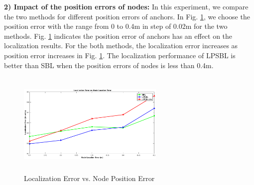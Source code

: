 \textbf{2) Impact of the position errors of nodes:}
 In this experiment, we compare the two methods for different position errors of anchors. 
 In Fig. \ref{fig5}, we choose the position error with the range from 0 to 0.4m in step of 0.02m for the two methods. 
 Fig. \ref{fig5} indicates the position error of anchors has an effect on the localization results. 
 For the both methods, the localization error increases as position error increases in Fig. \ref{fig5}. 
 The localization performance of LPSBL is better than SBL when the position errors of nodes is less than 0.4m.
  \begin{figure}[htb]
            \centering
		   \vspace{3mm}
			 \includegraphics[height=5.0cm,width=7.0cm]{image/locationerror.eps}
              \caption{Localization Error vs. Node Position Error}
             \vspace{-5mm}
             \label{fig5}
        \end{figure}

